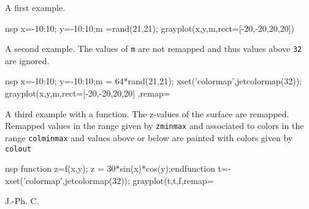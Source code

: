 \begin{examples}

\noindent A first example.
  \begin{mintednsp}{nsp}
    x=-10:10; y=-10:10;m =rand(21,21);
    grayplot(x,y,m,rect=[-20,-20,20,20])
  \end{mintednsp}

\noindent A second example. The values of \verb!m! are not remapped and
thus values above \verb!32! are ignored.

  \begin{mintednsp}{nsp}
    x=-10:10; y=-10:10;m = 64*rand(21,21);
    xset('colormap',jetcolormap(32));
    grayplot(x,y,m,rect=[-20,-20,20,20] ,remap=%
  \end{mintednsp}

\noindent A third example with a function. The z-values of the surface are remapped.
Remapped values in the range given by \verb!zminmax! and associated to colors in the range
\verb!colminmax! and values above or below are painted with colors given by \verb!colout!

  \begin{mintednsp}{nsp}
    function z=f(x,y); z = 30*sin(x)*cos(y);endfunction
    t=-%
    xset('colormap',jetcolormap(32));
    grayplot(t,t,f,remap=%
  \end{mintednsp}
\end{examples}

\begin{manseealso}
     
\end{manseealso}


\begin{authors}
  J.-Ph. C.
\end{authors}
